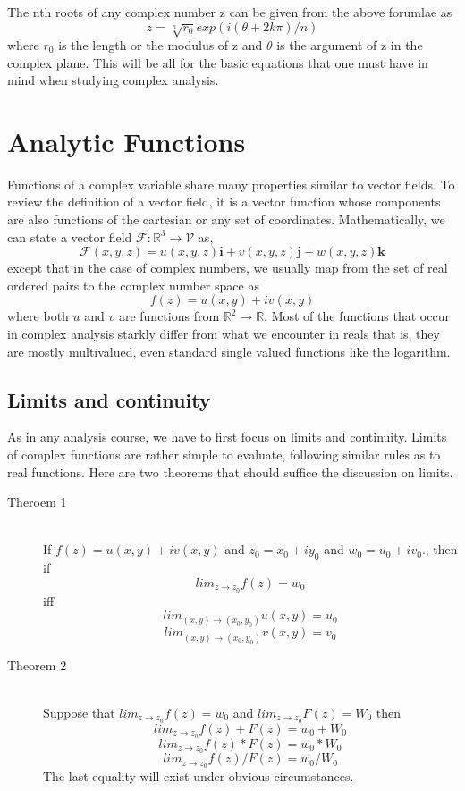 \documentclass[11pt]{article}
\begin{document}
\begin{sloppypar}
The nth roots of any complex number z can be given from the above forumlae as
\begin{equation}
	z = \sqrt[n]{r_{0}} exp(i(\theta+2k\pi)/n)
\end{equation}
where $r_{0}$ is the length or the modulus of z and $\theta$ is the argument of z in the complex plane. This will be all for the basic equations that one must have in mind when studying complex analysis. 

\section{Analytic Functions}
Functions of a complex variable share many properties similar to vector fields. To review the definition of a vector field, it is a vector function whose components are also functions of the cartesian or any set of coordinates. Mathematically, we can state a vector field $\mathcal{F}: \mathbb{R}^{3} \rightarrow \mathcal{V}$ as,
$$\mathcal{F}(x,y,z) = u(x,y,z)\mathbf{i} + v(x,y,z)\mathbf{j} + w(x,y,z)\mathbf{k}$$
except that in the case of complex numbers, we usually map from the set of real ordered pairs to the complex number space as 
$$f(z) = u(x,y)+iv(x,y)$$ where both $u$ and $v$ are functions from $\mathbb{R}^{2} \to \mathbb{R}$. Most of the functions that occur in complex analysis starkly differ from what we encounter in reals that is, they are mostly multivalued, even standard single valued functions like the logarithm. 

\subsection{Limits and continuity}
As in any analysis course, we have to first focus on limits and continuity. Limits of complex functions are rather simple to evaluate, following similar rules as to real functions. Here are two theorems that should suffice the discussion on limits.
\begin{description}
\item[Theroem 1] \hfill \\
	If $f(z) =  u(x,y)+iv(x,y)$ and $z_{0} = x_{0}+iy_{0}$ and $w_{0} = u_{0} + iv_{0}$., then if 
	$$lim_{z \to z_{0}} f(z) = w_{0}$$ iff
	$$lim_{(x,y) \to (x_{0},y_{0})} u(x,y) = u_{0}$$ $$lim_{(x,y) \to (x_{0},y_{0})} v(x,y) = v_{0}$$
\item[Theorem 2] \hfill \\
	Suppose that $lim_{z \to z_{0}} f(z) = w_{0}$ and $lim_{z \to z_{0}} F(z) = W_{0}$ then
	$$lim_{z \to z_{0}} f(z) + F(z) = w_{0} + W_{0}$$
	$$lim_{z \to z_{0}} f(z)*F(z) = w_{0}*W_{0}$$
	$$lim_{z \to z_{0}} f(z)/F(z) = w_{0}/W_{0}$$
The last equality will exist under obvious circumstances. 
\end{description}


\end{sloppypar}
\end{document}
